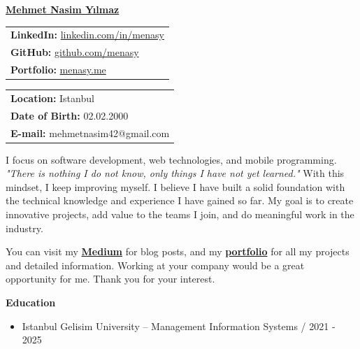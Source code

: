 \documentclass[a4paper,11pt]{article}
\begin{document}
\vspace*{-6.5em}
\begin{center}
    \href{https://menasy.me/}{\LARGE \textbf{Mehmet Nasim Yılmaz}}
\end{center}
\vspace*{0.5em}
\noindent
\begin{minipage}[t]{0.48\textwidth}
    \begin{tabular}{@{}l}
        \textbf{LinkedIn:} \href{https://linkedin.com/in/menasy}{linkedin.com/in/menasy} \\
        \textbf{GitHub:} \href{https://github.com/menasy}{github.com/menasy} \\
        \textbf{Portfolio:} \href{https://menasy.me/}{menasy.me} \\
    \end{tabular}
\end{minipage}%
\hfill
\begin{minipage}[t]{0.48\textwidth}
    \raggedleft
    \begin{tabular}{@{}l}
        \textbf{Location:} Istanbul \\
        \textbf{Date of Birth:} 02.02.2000 \\
        \textbf{E-mail:} mehmetnasim42@gmail.com \\
    \end{tabular}
\end{minipage}

\vspace{0.5em}

I focus on software development, web technologies, and mobile programming. \textit{"There is nothing I do not know, only things I have not yet learned."} With this mindset, I keep improving myself. I believe I have built a solid foundation with the technical knowledge and experience I have gained so far. My goal is to create innovative projects, add value to the teams I join, and do meaningful work in the industry.
\vspace{-0.2em}

You can visit my \textbf{\href{https://medium.com/@menasy}{Medium}} for blog posts, and my \textbf{\href{https://menasy.me/}{portfolio}} for all my projects and detailed information. Working at your company would be a great opportunity for me. Thank you for your interest.

\vspace{-0.1em}

\textbf{Education}
\vspace{-0.5em}
\begin{itemize}
  \item Istanbul Gelisim University – Management Information Systems / 2021 - 2025
\end{itemize}
\end{document}
